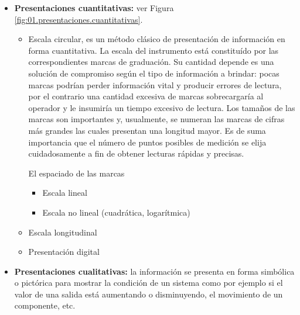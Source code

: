   \begin{itemize}
  \item {\bf Presentaciones cuantitativas:} ver Figura \ref{fig:01.presentaciones.cuantitativas}.
    \begin{itemize}
      \item Escala circular, es un m\'etodo cl\'asico de presentaci\'on de informaci\'on en forma cuantitativa. La escala del instrumento est\'a constitu\'ido por las correspondientes marcas de graduaci\'on. Su cantidad depende es una soluci\'on de compromiso seg\'un el tipo de informaci\'on a brindar: pocas marcas podr\'ian perder informaci\'on vital y producir errores de lectura, por el contrario una cantidad excesiva de marcas sobrecargar\'ia al operador y le insumir\'ia un tiempo excesivo de lectura. Los tama\~nos de las marcas son importantes y, usualmente, se numeran las marcas de cifras m\'as grandes las cuales presentan una longitud mayor. Es de suma importancia que el n\'umero de puntos posibles de medici\'on se elija cuidadosamente a fin de obtener lecturas r\'apidas y precisas.

El espaciado de las marcas 

      \begin{itemize}
         \item Escala lineal
         \item Escala no lineal (cuadr\'atica, logar\'itmica)
      \end{itemize}
       \item Escala longitudinal
       \item Presentaci\'on digital
    \end{itemize}
  \item {\bf Presentaciones cualitativas:} la información se presenta en forma simbólica o pictórica para mostrar la condición de un sistema como por ejemplo si el valor de una salida está aumentando o disminuyendo, el movimiento de un componente, etc. 





\end{itemize}
